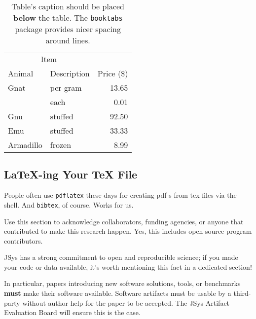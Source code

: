 \begin{table}
  \centering
  \begin{tabular}{llr}  
    \toprule
    \multicolumn{2}{c}{Item} \\
    \cmidrule(r){1-2}
    Animal    & Description & Price (\$) \\
    \midrule
    Gnat      & per gram    & 13.65      \\
    &    each     & 0.01       \\
    Gnu       & stuffed     & 92.50      \\
    Emu       & stuffed     & 33.33      \\
    Armadillo & frozen      & 8.99       \\
    \bottomrule
  \end{tabular}
  \caption{Table's caption should be placed \textbf{below} the table. The \texttt{booktabs} package provides nicer spacing around lines.}
  \label{tab:booktab_ex}
\end{table}
  
\subsection{LaTeX-ing Your TeX File}

People often use \texttt{pdflatex} these days for creating pdf-s from tex files
via the shell. And \texttt{bibtex}, of course. Works for us.

\acks

Use this section to acknowledge collaborators, funding agencies, or anyone that
contributed to make this research happen. Yes, this includes open source program
contributors.

\artifacts

JSys has a strong commitment to open and reproducible science; if you made your
code or data available, it's worth mentioning this fact in a dedicated section!

In particular, papers introducing new software solutions, tools, or benchmarks
\textbf{must} make their software available. Software artifacts must be usable
by a third-party without author help for the paper to be accepted. The JSys
Artifact Evaluation Board will ensure this is the case.







